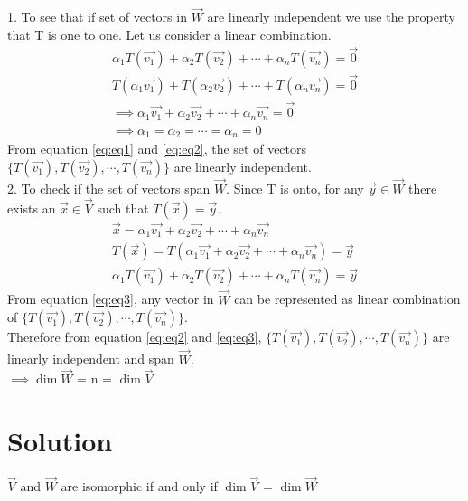 \documentclass[journal,12pt,twocolumn]{IEEEtran}
\begin{document}
1. To see that if set of vectors in $\vec{W}$ are linearly independent we use the property that T is one to one. Let us consider a linear combination.
\begin{align}
    \alpha_1T(\vec{v_1})+\alpha_2T(\vec{v_2})+\cdots+\alpha_nT(\vec{v_n}) = \vec{0}\label{eq:eq1}\\
    T(\alpha_1\vec{v_1})+T(\alpha_2\vec{v_2})+\cdots+T(\alpha_n\vec{v_n}) = \vec{0}\\
    \implies \alpha_1\vec{v_1}+\alpha_2\vec{v_2}+\cdots+\alpha_n\vec{v_n} = \vec{0}\\
    \implies \alpha_1=\alpha_2=\cdots=\alpha_n=0 \label{eq:eq2}
\end{align}
From equation \eqref{eq:eq1} and \eqref{eq:eq2}, the set of vectors $\{T(\vec{v_1}), T(\vec{v_2}),\cdots,T(\vec{v_n})\}$ are linearly independent.
\\

2. To check if the set of vectors span $\vec{W}$. Since T is onto, for any $\vec{y} \in \vec{W}$ there exists an $\vec{x} \in \vec{V}$ such that $T(\vec{x}) = \vec{y}$.
\begin{align}
    \vec{x} = \alpha_1\vec{v_1}+\alpha_2\vec{v_2}+\cdots+\alpha_n\vec{v_n}\\
    T(\vec{x}) = T(\alpha_1\vec{v_1}+\alpha_2\vec{v_2}+\cdots+\alpha_n\vec{v_n}) = \vec{y}\\
    \alpha_1T(\vec{v_1})+\alpha_2T(\vec{v_2})+\cdots+\alpha_nT(\vec{v_n}) = \vec{y} \label{eq:eq3}
\end{align}
From equation \eqref{eq:eq3}, any vector in $\vec{W}$ can be represented as linear combination of $\{T(\vec{v_1}), T(\vec{v_2}),\cdots,T(\vec{v_n})\}$.
\\

Therefore from equation \eqref{eq:eq2} and \eqref{eq:eq3}, $\{T(\vec{v_1}), T(\vec{v_2}),\cdots,T(\vec{v_n})\}$ are linearly independent and span $\vec{W}$.\\

$\implies \dim{\vec{W}}$ = n = $\dim{\vec{V}}$
\section{Solution}
$\vec{V}$ and $\vec{W}$ are isomorphic if and only if $\dim{\vec{V}}$ = $\dim{\vec{W}}$
\\
\end{document}
